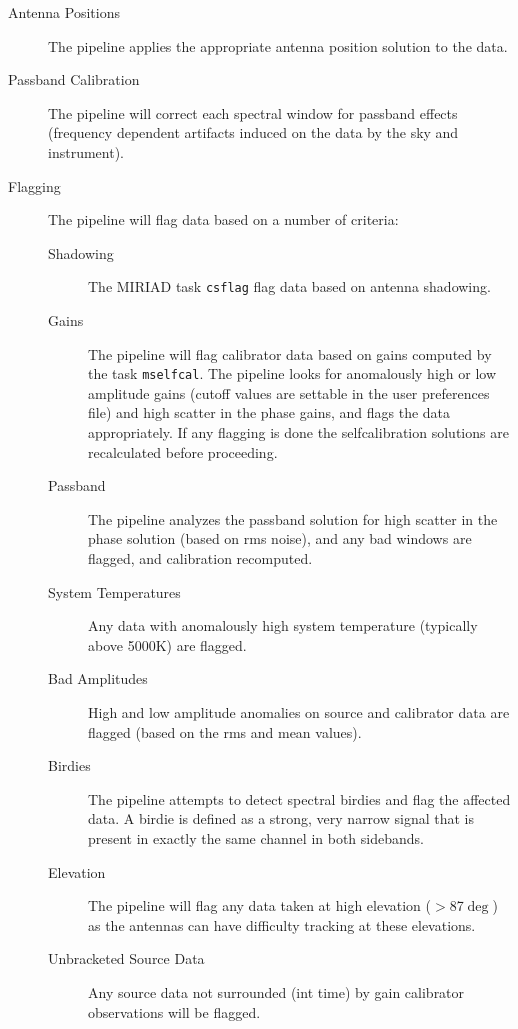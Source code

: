 \begin{description}
\item[Antenna Positions] The pipeline applies the appropriate antenna position solution to the data.
\item[Passband Calibration] The pipeline will correct each spectral window for passband effects (frequency dependent artifacts induced on the data by the sky and instrument).
\item[Flagging] The pipeline will flag data based on a number of criteria:
\begin{description}
\item[Shadowing] The MIRIAD task \verb#csflag# flag data based on antenna shadowing.
\item[Gains] The pipeline will flag calibrator data based on gains computed by the task \verb#mselfcal#. The pipeline looks for anomalously high or low amplitude gains (cutoff values are settable in the user preferences file) and high scatter in the phase gains, and flags the data appropriately. If any flagging is done the selfcalibration solutions are recalculated before proceeding.
\item[Passband] The pipeline analyzes the passband solution for high scatter in the phase solution (based on rms noise), and any bad windows are flagged, and calibration recomputed.
\item[System Temperatures] Any data with anomalously high system temperature (typically above 5000K) are flagged.
\item[Bad Amplitudes] High and low amplitude anomalies on source and calibrator data are flagged (based on the rms and mean values).
\item[Birdies] The pipeline attempts to detect spectral birdies and flag the affected data. A birdie is defined as a strong, very narrow signal that is present in exactly the same channel in both sidebands.
\item[Elevation] The pipeline will flag any data taken at high elevation ($>$87$\deg$) as the antennas can have difficulty tracking at these elevations.
\item[Unbracketed Source Data] Any source data not surrounded (int time) by gain calibrator observations will be flagged.

\end{description}
\end{description}
